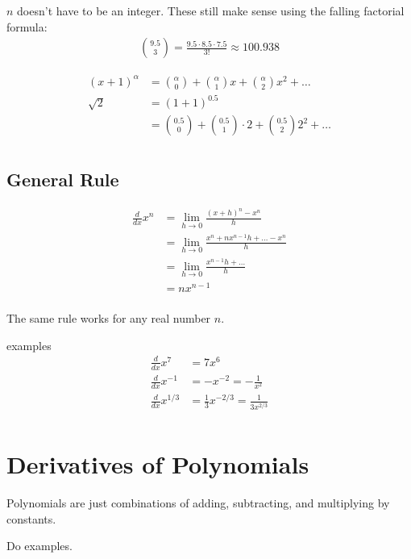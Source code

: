\documentclass[letterpaper, portrait]{exam}
\begin{document}
  $n$ doesn't have to be an integer. These still make sense using the falling factorial formula:
  \begin{align*}
    \binom{9.5}{3} = \frac{9.5 \cdot 8.5 \cdot 7.5}{3!} \approx 100.938
  \end{align*}

  \begin{align*}
    (x + 1)^\alpha & = \binom{\alpha}{0} + \binom{\alpha}{1} x + \binom{\alpha}{2} x^2 + \dots \\
    \sqrt{2}       & = (1 + 1)^{0.5}  \\
                   & = \binom{0.5}{0} + \binom{0.5}{1} \cdot 2 + \binom{0.5}{2} 2^2 + \dots \\
  \end{align*}

  \subsection{General Rule} %
  \label{sub:gr}
  
  \begin{align*}
    \frac{d}{dx} x^n & = \lim_{h \to 0} \frac{(x + h)^n - x^n}{h} \\
                     & = \lim_{h \to 0} \frac{x^n + nx^{n - 1}h + \ldots - x^n}{h} \\
                     & = \lim_{h \to 0} \frac{x^{n - 1}h + \ldots}{h} \\
                     & = n x^{n-1} \\
  \end{align*}

  The same rule works for any real number $n$.

  examples
  \begin{align*}
    \frac{d}{dx} x^7     & = 7x^6 \\
    \frac{d}{dx} x^{-1}  & = -x^{-2} = - \frac{1}{x^2} \\
    \frac{d}{dx} x^{1/3} & = \frac{1}{3} x^{-2/3} = \frac{1}{3 x^{2/3}} \\
  \end{align*}

  \section{Derivatives of Polynomials} %
  
  Polynomials are just combinations of adding, subtracting, and multiplying by constants. 
  
  Do examples.
\end{document}
